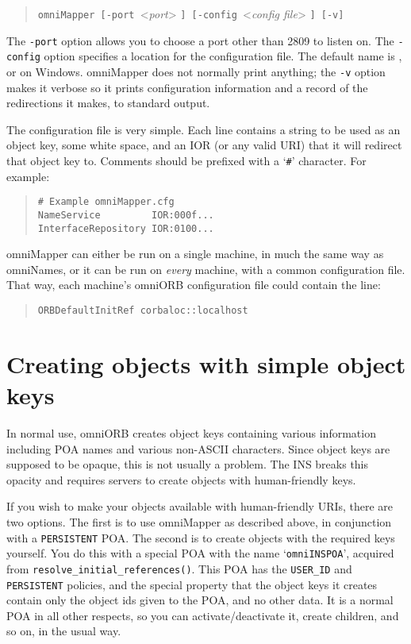 \documentclass[11pt,twoside,a4paper]{book}
\newcommand{\code}[1]{\texttt{#1}}
\newcommand{\op}[1]{\texttt{#1()}}
\newcommand{\cmdline}[1]{\texttt{#1}}
\newcommand{\file}{\begingroup \urlstyle{tt}\Url}
\begin{document}
\begin{quote}
\cmdline{omniMapper [-port }<\textit{port}>%
\cmdline{] [-config }<\textit{config file}>%
\cmdline{] [-v]}
\end{quote}

\noindent The \cmdline{-port} option allows you to choose a port other
than 2809 to listen on. The \cmdline{-config} option specifies a
location for the configuration file. The default name is
\file{/etc/omniMapper.cfg}, or \file{C:\omniMapper.cfg} on
Windows. omniMapper does not normally print anything; the \cmdline{-v}
option makes it verbose so it prints configuration information and a
record of the redirections it makes, to standard output.

The configuration file is very simple. Each line contains a string to
be used as an object key, some white space, and an IOR (or any valid
URI) that it will redirect that object key to. Comments should be
prefixed with a `\texttt{\#}' character. For example:

\begin{quote}
\begin{verbatim}
# Example omniMapper.cfg
NameService         IOR:000f...
InterfaceRepository IOR:0100...
\end{verbatim}
\end{quote}

omniMapper can either be run on a single machine, in much the same way
as omniNames, or it can be run on \emph{every} machine, with a common
configuration file. That way, each machine's omniORB configuration
file could contain the line:

\begin{quote}
\begin{verbatim}
ORBDefaultInitRef corbaloc::localhost
\end{verbatim}
\end{quote}



\section{Creating objects with simple object keys}

In normal use, omniORB creates object keys containing various
information including POA names and various non-ASCII characters.
Since object keys are supposed to be opaque, this is not usually a
problem. The INS breaks this opacity and requires servers to create
objects with human-friendly keys.

If you wish to make your objects available with human-friendly URIs,
there are two options. The first is to use omniMapper as described
above, in conjunction with a \code{PERSISTENT} POA. The second is to
create objects with the required keys yourself. You do this with a
special POA with the name `\texttt{omniINSPOA}', acquired from
\op{resolve\_initial\_references}. This POA has the \code{USER\_ID}
and \code{PERSISTENT} policies, and the special property that the
object keys it creates contain only the object ids given to the POA,
and no other data. It is a normal POA in all other respects, so you
can activate/deactivate it, create children, and so on, in the usual
way.
\end{document}
